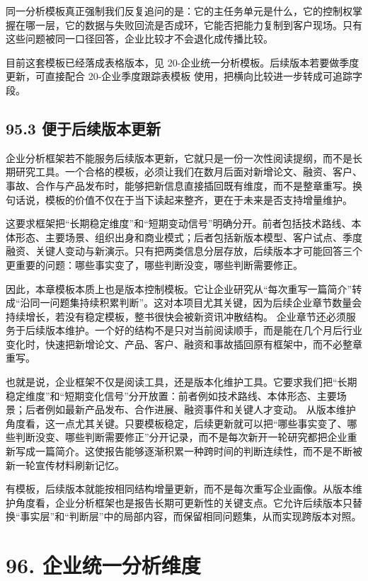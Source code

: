 同一分析模板真正强制我们反复追问的是：它的主任务单元是什么，它的控制权掌握在哪一层，它的数据与失败回流是否成环，它能否把能力复制到客户现场。只有这些问题被同一口径回答，企业比较才不会退化成传播比较。

目前这套模板已经落成表格版本，见 20-企业统一分析模板。后续版本若要做季度更新，可直接配合 20-企业季度跟踪表模板 使用，把横向比较进一步转成可追踪字段。

\subsection*{95.3 便于后续版本更新}


企业分析框架若不能服务后续版本更新，它就只是一份一次性阅读提纲，而不是长期研究工具。一个合格的模板，必须让我们在数月后面对新增论文、融资、客户、事故、合作与产品发布时，能够把新信息直接插回既有维度，而不是整章重写。换句话说，模板的价值不仅在于当下读起来整齐，更在于未来是否支持增量维护。

这要求框架把“长期稳定维度”和“短期变动信号”明确分开。前者包括技术路线、本体形态、主要场景、组织出身和商业模式；后者包括新版本模型、客户试点、季度融资、关键人变动与新演示。只有把两类信息分层存放，后续版本才可能回答三个更重要的问题：哪些事实变了，哪些判断没变，哪些判断需要修正。

因此，本章模板本质上也是版本控制模板。它让企业研究从“每次重写一篇简介”转成“沿同一问题集持续积累判断”。这对本项目尤其关键，因为后续企业章节数量会持续增长，若没有稳定模板，整书很快会被新资讯冲散结构。 企业章节还必须服务于后续版本维护。一个好的结构不是只对当前阅读顺手，而是能在几个月后行业变化时，快速把新增论文、产品、客户、融资和事故插回原有框架中，而不必整章重写。

也就是说，企业框架不仅是阅读工具，还是版本化维护工具。它要求我们把“长期稳定维度”和“短期变化信号”分开放置：前者例如技术路线、本体形态、主要场景；后者例如最新产品发布、合作进展、融资事件和关键人才变动。 从版本维护角度看，这一点尤其关键。只要模板稳定，后续更新就可以把“哪些事实变了、哪些判断没变、哪些判断需要修正”分开记录，而不是每次新开一轮研究都把企业重新写成一篇简介。这使报告能够逐渐积累一种跨时间的判断连续性，而不是不断被新一轮宣传材料刷新记忆。

有模板，后续版本就能按相同结构增量更新，而不是每次重写企业画像。从版本维护角度看，企业分析框架也是报告长期可更新性的关键支点。它允许后续版本只替换“事实层”和“判断层”中的局部内容，而保留相同问题集，从而实现跨版本对照。

\section*{96. 企业统一分析维度}

